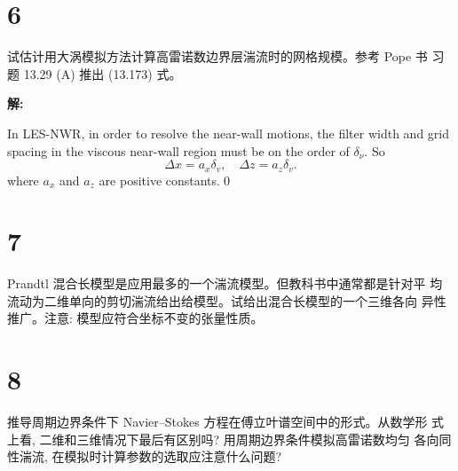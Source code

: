 \documentclass[12pt,a4]{ctexart}
\begin{document}
\section{6}

试估计用大涡模拟方法计算高雷诺数边界层湍流时的网格规模。参考 Pope 书
习题 13.29 (A) 推出 (13.173) 式。


\textsf{\hspace{-2em}\sf  \textbf{解:}}

In LES-NWR, in order to resolve the near-wall motions, the filter width and grid spacing in the viscous near-wall region must be on the order of $\delta_{\nu}$.\cite{pop} So 
\begin{equation}
   \Delta x=a_{x} \delta_{v}, \quad \Delta z=a_{z} \delta_{v}.
\end{equation}
where $a_x$ and $a_z$ are positive constants.\qed



\section{7}

Prandtl 混合长模型是应用最多的一个湍流模型。但教科书中通常都是针对平
均流动为二维单向的剪切湍流给出给模型。试给出混合长模型的一个三维各向
异性推广。注意: 模型应符合坐标不变的张量性质。


\section{8}

推导周期边界条件下 Navier--Stokes 方程在傅立叶谱空间中的形式。从数学形 式上看, 二维和三维情况下最后有区别吗? 用周期边界条件模拟高雷诺数均匀 各向同性湍流, 在模拟时计算参数的选取应注意什么问题?













\end{document}
